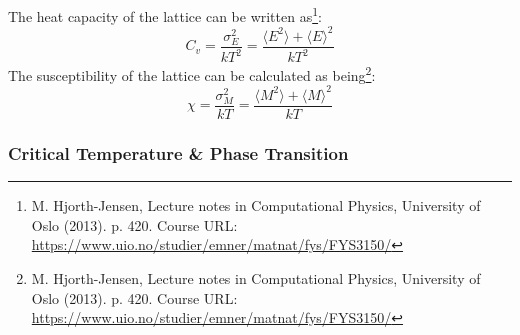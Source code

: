 \documentclass[reprint,english,notitlepage]{revtex4-1}  %
\begin{document}
The heat capacity of the lattice can be written as\footnote{M. Hjorth-Jensen, Lecture notes in Computational Physics, University of Oslo (2013). p. 420. Course URL: \url{https://www.uio.no/studier/emner/matnat/fys/FYS3150/}}:
\begin{equation}\label{eq:hctheory}
    C_v = \frac{\sigma_E^2}{kT^2} = \frac{\langle E^2 \rangle + \langle E \rangle^2}{kT^2}
\end{equation}
The susceptibility of the lattice can be calculated as being\footnote{M. Hjorth-Jensen, Lecture notes in Computational Physics, University of Oslo (2013). p. 420. Course URL: \url{https://www.uio.no/studier/emner/matnat/fys/FYS3150/}}:
\begin{equation}\label{eq:chitheory}
    \chi = \frac{\sigma_M^2}{kT} = \frac{\langle M^2 \rangle + \langle M \rangle^2}{kT}
\end{equation}

\subsubsection{Critical Temperature \& Phase Transition}
\end{document}
